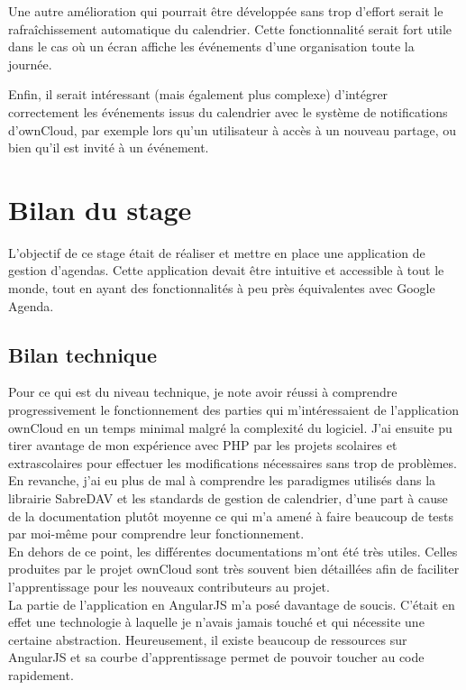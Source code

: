 \documentclass[10pt,a4paper, twoside]{report}
\begin{document}
	Une autre amélioration qui pourrait être développée sans trop d'effort serait le rafraîchissement automatique du calendrier. Cette fonctionnalité serait fort utile dans le cas où un écran affiche les événements d'une organisation toute la journée.
	
	Enfin, il serait intéressant (mais également plus complexe) d'intégrer correctement les événements issus du calendrier avec le système de notifications d'ownCloud, par exemple lors qu'un utilisateur à accès à un nouveau partage, ou bien qu'il est invité à un événement.
	
	\newpage\null\thispagestyle{empty}\newpage
	\chapter{Bilan du stage}
	L'objectif de ce stage était de réaliser et mettre en place une application de gestion d'agendas. Cette application devait être intuitive et accessible à tout le monde, tout en ayant des fonctionnalités à peu près équivalentes avec Google Agenda.
	\section{Bilan technique}
	Pour ce qui est du niveau technique, je note avoir réussi à comprendre progressivement le fonctionnement des parties qui m'intéressaient de l'application ownCloud en un temps minimal malgré la complexité du logiciel. J'ai ensuite pu tirer avantage de mon expérience avec PHP par les projets scolaires et extrascolaires pour effectuer les modifications nécessaires sans trop de problèmes.
	\\
	
	En revanche, j'ai eu plus de mal à comprendre les paradigmes utilisés dans la librairie SabreDAV et les standards de gestion de calendrier, d'une part à cause de la documentation plutôt moyenne ce qui m'a amené à faire beaucoup de tests par moi-même pour comprendre leur fonctionnement.
	\\
	
	En dehors de ce point, les différentes documentations m'ont été très utiles. Celles produites par le projet ownCloud sont très souvent bien détaillées afin de faciliter l'apprentissage pour les nouveaux contributeurs au projet.
	\\
	
	La partie de l'application en AngularJS m'a posé davantage de soucis. C'était en effet une technologie à laquelle je n'avais jamais touché et qui nécessite une certaine abstraction. Heureusement, il existe beaucoup de ressources sur AngularJS et sa courbe d'apprentissage permet de pouvoir toucher au code rapidement.
	
\end{document}
